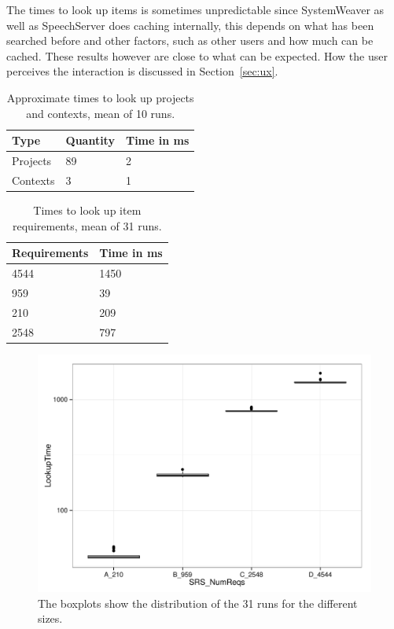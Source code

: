 The times to look up items is sometimes unpredictable since SystemWeaver as well as SpeechServer does caching internally, this depends on what has been searched before and other factors, such as other users and how much can be cached. These results however are close to what can be expected. How the user perceives the interaction is discussed in Section~\ref{sec:ux}.

\begin{table}[h]
\centering
\caption{Approximate times to look up projects and contexts, mean of 10 runs.}
\centering
    \begin{tabular}{l l l}
        \hline
        Type & Quantity & Time in ms \\
        \hline
        Projects & 89 & 2 \\
        Contexts & 3 & 1 \\
        \end{tabular}
\label{tab:timetype}
\end{table}

\begin{table}[h]
\centering
\caption{Times to look up item requirements, mean of 31 runs.}
\centering
    \begin{tabular}{l  l}
        \hline
        Requirements & Time in ms \\
        \hline
        4544 & 1450 \\
        959 & 39 \\
        210 & 209 \\
        2548 & 797
        \end{tabular}
\label{tabl:explsre}
\end{table}

\begin{figure}[h]
\centering
\includegraphics[width = 350pt, keepaspectratio = true]{fig/boxplots}
\caption{The boxplots show the distribution of the 31 runs for the different sizes.}
\label{fig:boxplots}
\end{figure}

